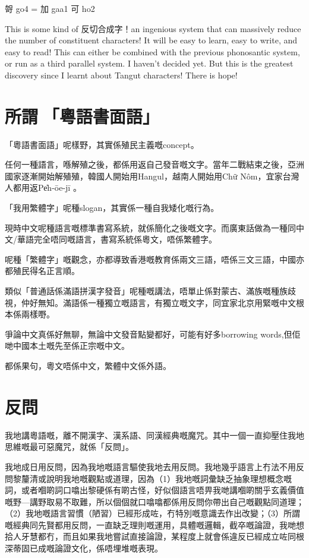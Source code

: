 哿 go4 = 加 gaa1 可 ho2

This is some kind of 反切合成字！an ingenious system that can massively reduce the number of constituent characters! It will be easy to learn, easy to write, and easy to read! This can either be combined with the previous phonosantic system, or run as a third parallel system. I haven't decided yet. But this is the greatest discovery since I learnt about Tangut characters! There is hope!




\section{所謂󱝚「粵語書面語」}

「粵語書面語」呢樣野，其實係殖民主義嘅concept。

任何一種語言，喺解殖之後，都係用返自己發音嘅文字。當年二戰結束之後，亞洲國家逐漸開始解殖殖，韓國人開始用Hangul，越南人開始用Chữ Nôm，宜家台灣人都用返Pe̍h-ōe-jī 。

「我用繁體字」呢種slogan，其實係一種自我矮化嘅行為。

現時中文呢種語言嘅標準書寫系統，就係簡化之後嘅文字。而廣東話做為一種同中文/華語完全唔同嘅語言，書寫系統係粵文，唔係繁體字。

呢種「繁體字」嘅觀念，亦都導致香港嘅教育係兩文三語，唔係三文三語，中國亦都殖民得名正言順。

類似「普通話係滿語拼漢字發音」呢種嘅講法，唔單止係對蒙古、滿族嘅種族歧視，仲好無知。滿語係一種獨立嘅語言，有獨立嘅文字，同宜家北京用緊嘅中文根本係兩樣嘢。

爭論中文真係好無聊，無論中文發音點變都好，可能有好多borrowing words,但佢哋中國本土嘅先至係正宗嘅中文。

都係果句，粵文唔係中文，繁體中文係外語。


\section{反問}
我地講粵語嘅，離不開漢字、漢系語、同漢經典嘅魔咒。其中一個一直抑壓住我地思維嘅最可惡魔咒，就係「反問」。

我地成日用反問，因為我地嘅語言驅使我地去用反問。我地幾乎語言上冇法不用反問黎釐清或說明我地嘅觀點或道理，因為（1）我地嘅詞彙缺乏抽象理想概念嘅詞，或者嗰啲詞口噏出黎硬係有啲古怪，好似個語言唔畀我哋講嗰啲關乎玄義價值嘅野—講野取易不取難，所以個個就口噏噏都係用反問你帶出自己嘅觀點同道理；（2）我地嘅語言習慣（陋習）已經形成咗，冇特別嘅意識去作出改變；（3）所謂嘅經典同先賢都用反問，一直缺乏理則嘅運用，具體嘅邏輯，截卒嘅論證，我哋想拾人牙慧都冇，而且如果我地嘗試直接論證，某程度上就會係違反已經成立咗同根深蒂固已成嘅論證文化，係唔埋堆嘅表現。

